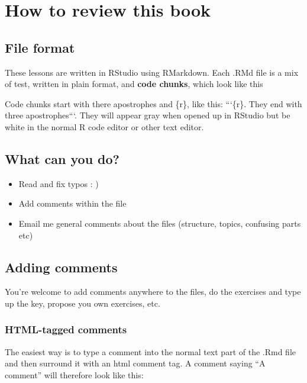 \documentclass[
]{book}
\providecommand{\tightlist}{%
  \setlength{\itemsep}{0pt}\setlength{\parskip}{0pt}}
\begin{document}
\hypertarget{how-to-review-this-book}{%
\chapter{How to review this book}\label{how-to-review-this-book}}

\hypertarget{file-format}{%
\section{File format}\label{file-format}}

These lessons are written in RStudio using RMarkdown. Each .RMd file is a mix of test, written in plain format, and \textbf{code chunks}, which look like this

Code chunks start with there apostrophes and \{r\}, like this: ```\{r\}. They end with three apostrophes```. They will appear gray when opened up in RStudio but be white in the normal R code editor or other text editor.

\hypertarget{what-can-you-do}{%
\section{What can you do?}\label{what-can-you-do}}

\begin{itemize}
\tightlist
\item
  Read and fix typos : )
\item
  Add comments within the file
\item
  Email me general comments about the files (structure, topics, confusing parts etc)
\end{itemize}

\hypertarget{adding-comments}{%
\section{Adding comments}\label{adding-comments}}

You're welcome to add comments anywhere to the files, do the exercises and type up the key, propose you own exercises, etc.

\hypertarget{html-tagged-comments}{%
\subsection{HTML-tagged comments}\label{html-tagged-comments}}

The easiest way is to type a comment into the normal text part of the .Rmd file and then surround it with an html comment tag. A comment saying ``A comment'' will therefore look like this:
\end{document}
